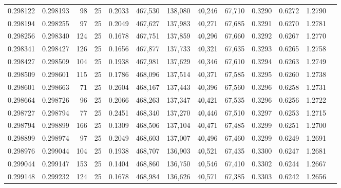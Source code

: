 \begin{tabular}{rrrrrrrrrrrrr}
0.298122 & 0.298193 &    98 &  25 &                                     0.2033 & 467,530 & 138,080 &  40,246 &  67,710 & 0.3290 & 0.6272 & 1.2790 \\
0.298194 & 0.298255 &    97 &  25 &                                     0.2049 & 467,627 & 137,983 &  40,271 &  67,685 & 0.3291 & 0.6270 & 1.2781 \\
0.298256 & 0.298340 &   124 &  25 &                                     0.1678 & 467,751 & 137,859 &  40,296 &  67,660 & 0.3292 & 0.6267 & 1.2770 \\
0.298341 & 0.298427 &   126 &  25 &                                     0.1656 & 467,877 & 137,733 &  40,321 &  67,635 & 0.3293 & 0.6265 & 1.2758 \\
0.298427 & 0.298509 &   104 &  25 &                                     0.1938 & 467,981 & 137,629 &  40,346 &  67,610 & 0.3294 & 0.6263 & 1.2749 \\
0.298509 & 0.298601 &   115 &  25 &                                     0.1786 & 468,096 & 137,514 &  40,371 &  67,585 & 0.3295 & 0.6260 & 1.2738 \\
0.298601 & 0.298663 &    71 &  25 &                                     0.2604 & 468,167 & 137,443 &  40,396 &  67,560 & 0.3296 & 0.6258 & 1.2731 \\
0.298664 & 0.298726 &    96 &  25 &                                     0.2066 & 468,263 & 137,347 &  40,421 &  67,535 & 0.3296 & 0.6256 & 1.2722 \\
0.298727 & 0.298794 &    77 &  25 &                                     0.2451 & 468,340 & 137,270 &  40,446 &  67,510 & 0.3297 & 0.6253 & 1.2715 \\
0.298794 & 0.298899 &   166 &  25 &                                     0.1309 & 468,506 & 137,104 &  40,471 &  67,485 & 0.3299 & 0.6251 & 1.2700 \\
0.298899 & 0.298974 &    97 &  25 &                                     0.2049 & 468,603 & 137,007 &  40,496 &  67,460 & 0.3299 & 0.6249 & 1.2691 \\
0.298976 & 0.299044 &   104 &  25 &                                     0.1938 & 468,707 & 136,903 &  40,521 &  67,435 & 0.3300 & 0.6247 & 1.2681 \\
0.299044 & 0.299147 &   153 &  25 &                                     0.1404 & 468,860 & 136,750 &  40,546 &  67,410 & 0.3302 & 0.6244 & 1.2667 \\
0.299148 & 0.299232 &   124 &  25 &                                     0.1678 & 468,984 & 136,626 &  40,571 &  67,385 & 0.3303 & 0.6242 & 1.2656 \\

\end{tabular}
